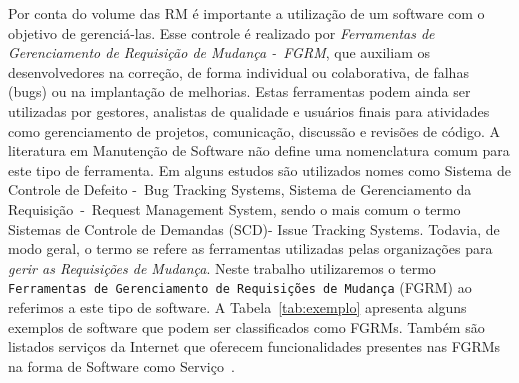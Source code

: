 Por conta do volume das RM é importante a utilização de um software com o
objetivo de gerenciá-las. Esse controle é realizado por \textit{Ferramentas de
    Gerenciamento de Requisição de Mudança -~FGRM}, que auxiliam os
desenvolvedores na correção, de forma individual ou colaborativa, de falhas
(bugs) ou na implantação de melhorias. Estas ferramentas podem ainda ser
utilizadas por gestores, analistas de qualidade e usuários finais para
atividades como gerenciamento de projetos, comunicação, discussão e revisões de
código. A literatura em Manutenção de Software não define uma nomenclatura comum
para este tipo de ferramenta. Em alguns estudos são utilizados nomes como
Sistema de Controle de Defeito -~Bug Tracking Systems, Sistema de Gerenciamento
da Requisição~-~Request Management System, sendo o mais comum o termo Sistemas
de Controle de Demandas (SCD)- Issue Tracking Systems. Todavia, de modo geral, o
termo se refere as ferramentas utilizadas pelas organizações para \textit{gerir
    as Requisições de Mudança}. Neste trabalho utilizaremos o termo
\texttt{Ferramentas de Gerenciamento de Requisições de Mudança} (FGRM) ao
referimos a este tipo de software. A Tabela~\ref{tab:exemplo} apresenta alguns
exemplos de software que podem ser classificados como FGRMs. Também são listados
serviços da Internet que oferecem funcionalidades presentes nas FGRMs na forma
de Software como Serviço~\cite{fox2013engineering}.

\begin{table}[htpb]
\centering
{}
\caption{Exemplos de ferramentas e serviços da Internet que podem ser
    classificados como FGRMs. Extraído de~\cite{cavalcanti2014challenges}}
\label{tab:exemplo}
\end{table}

